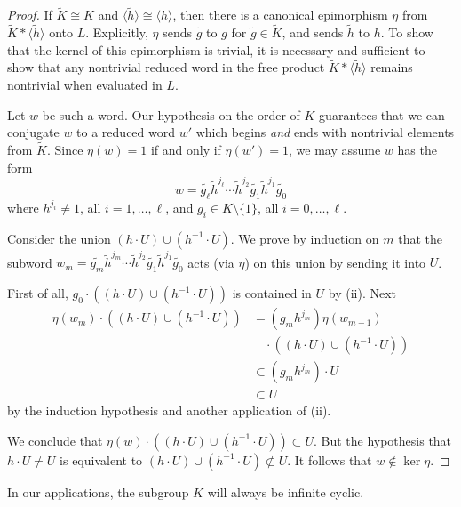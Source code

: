 \documentclass{amsart}
\theoremstyle{plain}
\theoremstyle{definition}
\theoremstyle{remark}
\begin{document}
\begin{proof}
If $\widetilde{K} \cong K$ and $\langle \widetilde{h}\rangle \cong \langle h\rangle$, then there
is a canonical epimorphism $\eta$ from $\widetilde{K} * \langle \widetilde{h} \rangle$ onto $L$.
Explicitly, $\eta$ sends $\widetilde{g}$ to $g$ for $\widetilde{g} \in \widetilde{K}$,
and sends $\widetilde{h}$ to $h$. To show that the kernel of this epimorphism is trivial, it
is necessary and sufficient to show that any nontrivial reduced word in the free product
$\widetilde{K} * \langle \widetilde{h} \rangle$ remains nontrivial when evaluated in $L$.

Let $w$ be such a word.
Our hypothesis on the order of $K$ guarantees that we can conjugate $w$ to a reduced word
$w'$
which begins \emph{and} ends with nontrivial elements from $\widetilde{K}$. Since $\eta(w) =
1$ if and only if $\eta(w') = 1$, we may assume $w$ has the form
$$w = \widetilde{g_{\ell}}\widetilde{h}^{j_{\ell}}\cdots
\widetilde{h}^{j_{2}}\widetilde{g_{1}}\widetilde{h}^{j_{1}}\widetilde{g_{0}}$$
where $h^{j_{i}} \neq 1$, all $i = 1,\ldots,\ell$, and $g_{i} \in K \setminus \{1\}$,
all $i = 0,\ldots,\ell$.

Consider the union $(h\cdot U) \cup (h^{-1}\cdot U)$. We prove by induction on $m$ that the
subword $w_{m} = \widetilde{g_{m}}\widetilde{h}^{j_{m}}\cdots
\widetilde{h}^{j_{2}}\widetilde{g_{1}}\widetilde{h}^{j_{1}}\widetilde{g_{0}}$ acts (via $\eta$) on this
union by sending it into $U$.

First
of all, $g_{0}\cdot ((h\cdot U) \cup (h^{-1}\cdot U))$ is contained in $U$ by (ii). Next
\begin{equation*}
\begin{split}
\eta(w_{m})\cdot ((h\cdot U) \cup (h^{-1}\cdot U)) & =
 (g_{m}h^{j_{m}})\eta(w_{m-1})\\
&\quad\cdot ((h\cdot U) \cup (h^{-1}\cdot U))\\
& \subset (g_{m}h^{j_{m}})\cdot U\\
& \subset U
\end{split}
\end{equation*}
by the induction hypothesis and another application of (ii).

We conclude that $\eta(w)\cdot ((h\cdot U) \cup (h^{-1}\cdot U)) \subset U$. But the
hypothesis that $h\cdot U
\neq U$ is equivalent to $(h\cdot U) \cup (h^{-1}\cdot U) \not\subset
U$. It follows that $w \notin \ker \eta$.
\end{proof}

In our applications, the subgroup $K$ will always be infinite cyclic.
\end{document}

